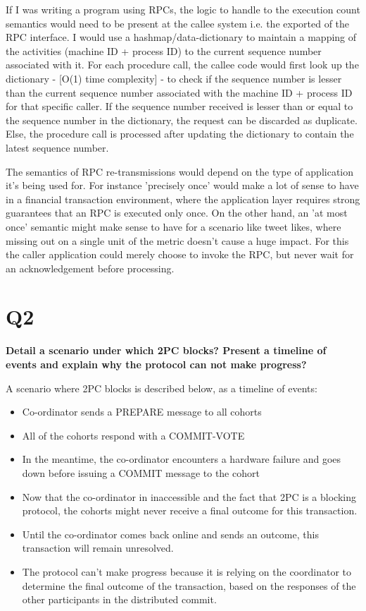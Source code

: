 \documentclass[a4paper]{article}
\begin{document}
    If I was writing a program using RPCs, the logic to handle to the execution count semantics would need to be present at the callee system i.e. the exported of the RPC interface. I would use a hashmap/data-dictionary to maintain a mapping of the activities (machine ID + process ID) to the current sequence number associated with it. For each procedure call, the callee code would first look up the dictionary - ​[​O(1) time complexity​]​ - to check if the sequence number is lesser than the current sequence number associated with the machine ID + process ID for that specific caller. If the sequence number received is lesser than or equal to the sequence number in the dictionary, the request can be discarded as duplicate. Else, the procedure call is processed after updating the dictionary to contain the latest sequence number.

    The semantics of RPC re-transmissions would depend on the type of application it's being used for. For instance 'precisely once' would make a lot of sense to have in a financial transaction environment, where the application layer requires strong guarantees that an RPC is executed only once. 
    On the other hand, an 'at most once' sem​​antic might make sense to have for a scenario like tweet likes, where missing out on a single unit of the metric doesn't cause a huge impact. For this the caller application could merely choose to invoke the RPC, but never wait for an acknowledgement before processing.



\section{Q2} %
\label{sec:q2}

    \textbf{Detail a scenario under which 2PC blocks? Present a timeline of events and explain why the protocol can not make progress?}

    A scenario where 2PC blocks is described below, as a timeline of events:
    \begin{itemize}
        \item
        Co-ordinator sends a PREPARE message to all cohorts
        \item
        All of the cohorts respond with a COMMIT-VOTE
        \item
        In the meantime, the co-ordinator encounters a hardware failure and goes down before issuing a COMMIT message to the cohort
        \item
        Now that the co-ordinator in inaccessible and the fact that 2PC is a blocking protocol, the cohorts might never receive a final outcome for this transaction.
        \item
        Until the co-ordinator comes back online and sends an outcome, this transaction will remain unresolved.
        \item
        The protocol can't make progress because it is relying on the coordinator to determine the final outcome of the transaction, based on the responses of the other participants in the distributed commit.
    \end{itemize}
\end{document}
